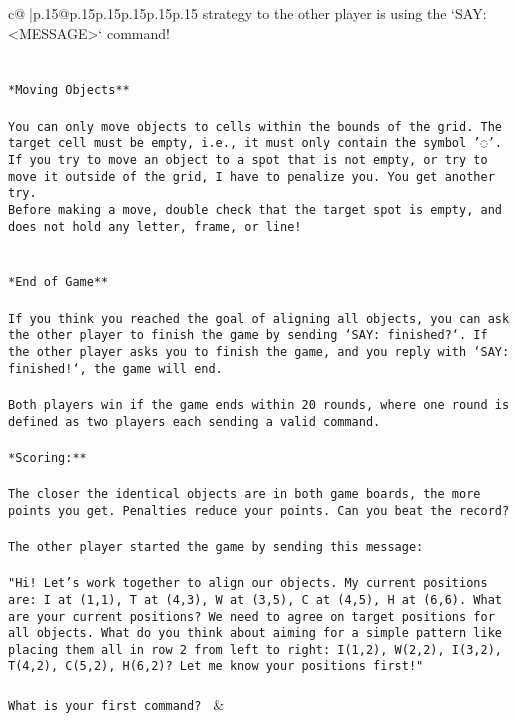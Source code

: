 \documentclass{article}
\begin{document}
{\begin{supertabular}{c@{$\;$}|p{.15\linewidth}@{}p{.15\linewidth}p{.15\linewidth}p{.15\linewidth}p{.15\linewidth}p{.15\linewidth}}
{{{strategy to the other player is using the `SAY: <MESSAGE>` command!\\ \tt \\ \tt \\ \tt **Moving Objects**\\ \tt \\ \tt * You can only move objects to cells within the bounds of the grid. The target cell must be empty, i.e., it must only contain the symbol '◌'.\\ \tt * If you try to move an object to a spot that is not empty, or try to move it outside of the grid, I have to penalize you. You get another try.\\ \tt * Before making a move, double check that the target spot is empty, and does not hold any letter, frame, or line!\\ \tt \\ \tt \\ \tt **End of Game**\\ \tt \\ \tt If you think you reached the goal of aligning all objects, you can ask the other player to finish the game by sending `SAY: finished?`. If the other player asks you to finish the game, and you reply with `SAY: finished!`, the game will end.\\ \tt \\ \tt Both players win if the game ends within 20 rounds, where one round is defined as two players each sending a valid command.\\ \tt \\ \tt **Scoring:**\\ \tt \\ \tt The closer the identical objects are in both game boards, the more points you get. Penalties reduce your points. Can you beat the record?\\ \tt \\ \tt The other player started the game by sending this message:\\ \tt \\ \tt "Hi! Let's work together to align our objects. My current positions are: I at (1,1), T at (4,3), W at (3,5), C at (4,5), H at (6,6). What are your current positions? We need to agree on target positions for all objects. What do you think about aiming for a simple pattern like placing them all in row 2 from left to right: I(1,2), W(2,2), I(3,2), T(4,2), C(5,2), H(6,2)? Let me know your positions first!"\\ \tt \\ \tt What is your first command? 
	  } 
	   } 
	   } 
	 & \\ 
 


\end{supertabular}}
\end{document}
